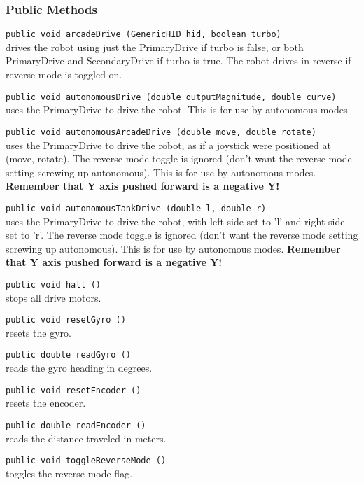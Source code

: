 \documentclass[]{article}
\begin{document}
\subsubsection{Public Methods}

\noindent
\lstinline[]|public void arcadeDrive (GenericHID hid, boolean turbo)| \\
drives the robot using just the PrimaryDrive if turbo is false, or both PrimaryDrive and SecondaryDrive if turbo is true.
The robot drives in reverse if reverse mode is toggled on.

\noindent
\lstinline[]|public void autonomousDrive (double outputMagnitude, double curve)| \\
uses the PrimaryDrive to drive the robot. 
This is for use by autonomous modes.

\noindent
\lstinline[]|public void autonomousArcadeDrive (double move, double rotate)| \\
uses the PrimaryDrive to drive the robot, as if a joystick were positioned at (move, rotate). 
The reverse mode toggle is ignored (don't want the reverse mode setting screwing up autonomous).
This is for use by autonomous modes.
\textbf{Remember that Y axis pushed forward is a negative Y!}

\noindent
\lstinline[]|public void autonomousTankDrive (double l, double r)| \\
uses the PrimaryDrive to drive the robot, with left side set to 'l' and right side set to 'r'.
The reverse mode toggle is ignored (don't want the reverse mode setting screwing up autonomous).
This is for use by autonomous modes.
\textbf{Remember that Y axis pushed forward is a negative Y!}

\noindent
\lstinline[]|public void halt ()| \\
stops all drive motors.

\noindent
\lstinline[]|public void resetGyro ()| \\
resets the gyro.

\noindent
\lstinline[]|public double readGyro ()| \\
reads the gyro heading in degrees.

\noindent
\lstinline[]|public void resetEncoder ()| \\
resets the encoder.

\noindent
\lstinline[]|public double readEncoder ()| \\
reads the distance traveled in meters.

\noindent
\lstinline[]|public void toggleReverseMode ()| \\
toggles the reverse mode flag.
\end{document}
